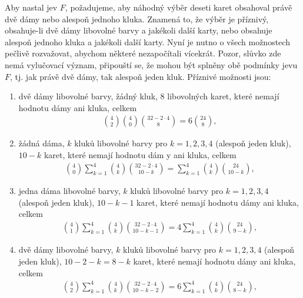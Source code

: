 \begin{mdframed}[style=mdexam]
\begin{example}
      Aby nastal jev \(F\), požadujeme, aby náhodný výběr deseti karet obsahoval právě dvě dámy nebo
      alespoň jednoho kluka. Znamená to, že výběr je příznivý, obsahuje-li dvě dámy libovolné barvy
      a jakékoli další karty, nebo obsahuje alespoň jednoho kluka a jakékoli další karty. Nyní je
      nutno o všech možnostech pečlivě rozvažovat, abychom některé nezapočítali vícekrát. Pozor,
      slůvko  zde nemá vylučovací význam, připouští se, že mohou být splněny obě podmínky
      jevu \(F\), tj. jak právě dvě dámy, tak alespoň jeden kluk. Příznivé možnosti jsou:
      \begin{enumerate}[leftmargin=10pt,noitemsep]
        \item dvě dámy libovolné barvy, žádný kluk, \num{8} libovolných karet, které nemají hodnotu
              dámy ani kluka, celkem
              \begin{gather*}
                \binom{4}{2}\binom{4}{0}\binom{32 - 2\cdot4}{8} = 6\binom{24}{8},
              \end{gather*}
        \item žádná dáma, \(k\) kluků libovolné barvy pro \(k = 1, 2, 3, 4\) (alespoň jeden kluk),
              \(10 - k\) karet, které nemají hodnotu dám y ani kluka, celkem
              \begin{gather*}
                \binom{4}{0}\sum^{4}_{k=1}\binom{4}{k}\binom{32 - 2\cdot4}{10 - k} =
                            \sum^{4}_{k=1}\binom{4}{k}\binom{24}{10 - k},
              \end{gather*}
        \item jedna dáma libovolné barvy, \(k\) kluků libovolné barvy pro \(k = 1,2, 3, 4\) (alespoň
              jeden kluk), \(10 - k - 1\) karet, které nemají hodnotu dámy ani kluka, celkem
              \begin{gather*}
                \binom{4}{1}\sum^{4}_{k=1}\binom{4}{k}\binom{32 - 2\cdot4}{10 - k - 1} =
                           4\sum^{4}_{k=1}\binom{4}{k}\binom{24}{9 - k},
              \end{gather*}
        \item dvě dámy libovolné barvy, \(k\) kluků libovolné barvy pro \(k = 1, 2, 3, 4\) (alespoň
              jeden kluk), \(10 - 2 - k = 8 - k\) karet, které nemají hodnotu dámy ani kluka, celkem
              \begin{gather*}
                \binom{4}{2}\sum^{4}_{k=1}\binom{4}{k}\binom{32 - 2\cdot4}{10 - k - 2} =
                           6\sum^{4}_{k=1}\binom{4}{k}\binom{24}{8 - k},
              \end{gather*}

\end{enumerate}
\end{example}
\end{mdframed}
